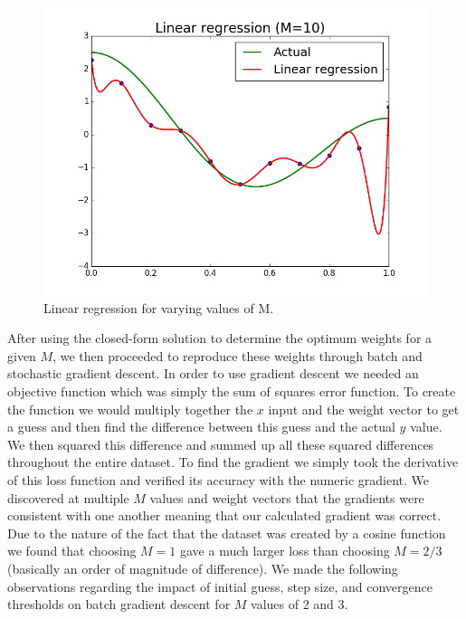 \documentclass{article}
\begin{document}
\begin{figure}[width=\linewidth]
\begin{multicols}{2}
  \includegraphics[width=1.2\linewidth]{code/P2/linear_regression,10.png}
\end{multicols}
\caption{Linear regression for varying values of M.}
\end{figure}

After using the closed-form solution to determine the optimum weights for a given $M$, we then proceeded to reproduce these weights through batch and stochastic gradient descent. In order to use gradient descent we needed an objective function which was simply the sum of squares error function. To create the function we would multiply together the $x$ input and the weight vector to get a guess and then find the difference between this guess and the actual $y$ value. We then squared this difference and summed up all these squared differences throughout the entire dataset. To find the gradient we simply took the derivative of this loss function and verified its accuracy with the numeric gradient. We discovered at multiple $M$ values and weight vectors that the gradients were consistent with one another meaning that our calculated gradient was correct. Due to the nature of the fact that the dataset was created by a cosine function we found that choosing $M = 1$ gave a much larger loss than choosing $M = 2/3$ (basically an order of magnitude of difference). We made the following observations regarding the impact of initial guess, step size, and convergence thresholds on batch gradient descent for $M$ values of 2 and 3.
\end{document}
